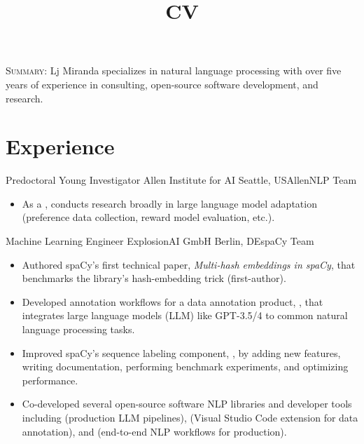 \documentclass[12pt,a4paper]{moderncv}
\title{CV}
\begin{document}
\maketitle

\textsc{Summary}: Lj Miranda specializes in natural language processing with over five years of
experience in consulting, open-source software development, and research.

\section{Experience}

{Predoctoral Young Investigator}
{Allen Institute for AI}
{Seattle, US}{AllenNLP Team}
{
    \begin{itemize}
        \item As a {\color{blue}}, conducts
              research broadly in large language model adaptation (preference data collection, reward model evaluation, etc.).
    \end{itemize}
}
\vspace{0.5em}

{Machine Learning Engineer}
{ExplosionAI GmbH}
{Berlin, DE}{spaCy Team}
{
    \begin{itemize}
        \item Authored spaCy's first technical paper, \textit{Multi-hash
                  embeddings in spaCy}, that benchmarks the library's hash-embedding trick
              (first-author).
        \item Developed annotation workflows for a data annotation product,
              {\color{blue}}, that integrates large
              language models (LLM) like GPT-3.5/4 to common natural language processing tasks.
        \item Improved spaCy's sequence labeling component,
              {\color{blue}}, by
              adding new features, writing documentation, performing benchmark
              experiments, and optimizing performance.
        \item Co-developed several open-source software NLP libraries and
              developer tools including
                  {\color{blue}}
              (production LLM pipelines),
              {\color{blue}}
              (Visual Studio Code extension for data annotation), and
                  {\color{blue}}
              (end-to-end NLP workflows for production).
    \end{itemize}
}
\vspace{0.5em}
\end{document}
